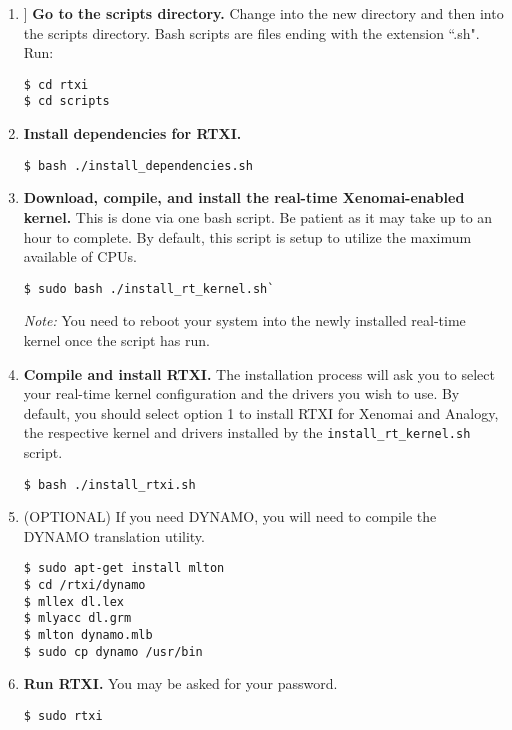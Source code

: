 \begin{enumerate}
\item ] \textbf{Go to the scripts directory.} Change into the new directory and then into the scripts directory. Bash scripts are files ending with the extension ``.sh". Run:

\begin{verbatim}
$ cd rtxi
$ cd scripts
\end{verbatim}

\item \textbf{Install dependencies for RTXI.}

\begin{verbatim}
$ bash ./install_dependencies.sh
\end{verbatim}

\item \textbf{Download, compile, and install the real-time Xenomai-enabled kernel.} This is done via one bash script. Be patient as it may take up to an hour to complete. By default, this script is setup to utilize the maximum available of CPUs.

\begin{verbatim}
$ sudo bash ./install_rt_kernel.sh`
\end{verbatim}

\begin{comment}
When the configuration options appear, specify your processor. If your processor is not listed, choose the 'generic' option.
\end{comment}
\textit{Note:} You need to reboot your system into the newly installed real-time kernel once the script has run. 

\item \textbf{Compile and install RTXI.} The installation process will ask you to select your real-time kernel configuration and the drivers you wish to use. By default, you should select option 1 to install RTXI for Xenomai and Analogy, the respective kernel and drivers installed by the \texttt{install\_rt\_kernel.sh} script.

\begin{verbatim}
$ bash ./install_rtxi.sh
\end{verbatim}

\item (OPTIONAL) If you need DYNAMO, you will need to compile the DYNAMO translation utility.
\label{install DYNAMO}
\begin{verbatim}
$ sudo apt-get install mlton
$ cd /rtxi/dynamo
$ mllex dl.lex
$ mlyacc dl.grm
$ mlton dynamo.mlb
$ sudo cp dynamo /usr/bin
\end{verbatim}

\item \textbf{Run RTXI.} You may be asked for your password.

\begin{verbatim}
$ sudo rtxi
\end{verbatim}

\end{enumerate}